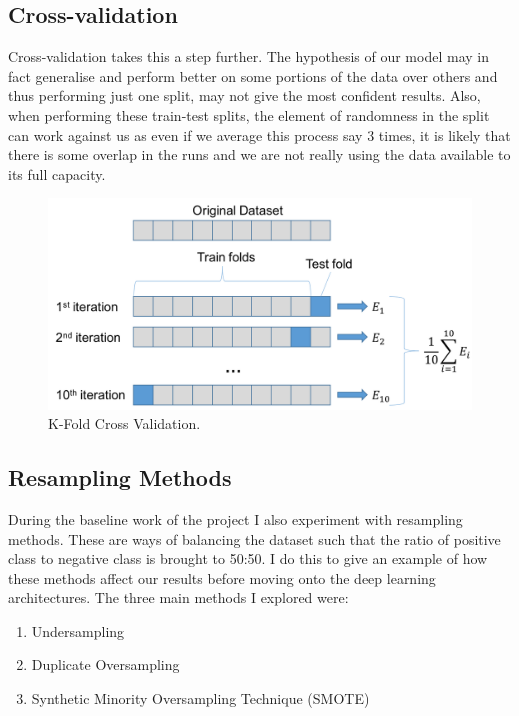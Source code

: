 \documentclass[12pt,a4paper,twoside]{report}
\begin{document}
\subsection{Cross-validation}

Cross-validation takes this a step further. The hypothesis of our model may in fact generalise and perform better on some portions of the data over others and thus performing just one split, may not give the most confident results. Also, when performing these train-test splits, the element of randomness in the split can work against us as even if we average this process say 3 times, it is likely that there is some overlap in the runs and we are not really using the data available to its full capacity. 

\begin{figure}[H]

\centering
\includegraphics[scale=0.8]{cross-val}
\caption{K-Fold Cross Validation.}
\end{figure}

\subsection{Resampling Methods}

During the baseline work of the project I also experiment with resampling methods. These are ways of balancing the dataset such that the ratio of positive class to negative class is brought to 50:50. I do this to give an example of how these methods affect our results before moving onto the deep learning architectures. 
The three main methods I explored were:

\begin{enumerate}
  \item Undersampling 
  \item Duplicate Oversampling
  \item Synthetic Minority Oversampling Technique (SMOTE)
\end{enumerate}
\end{document}
